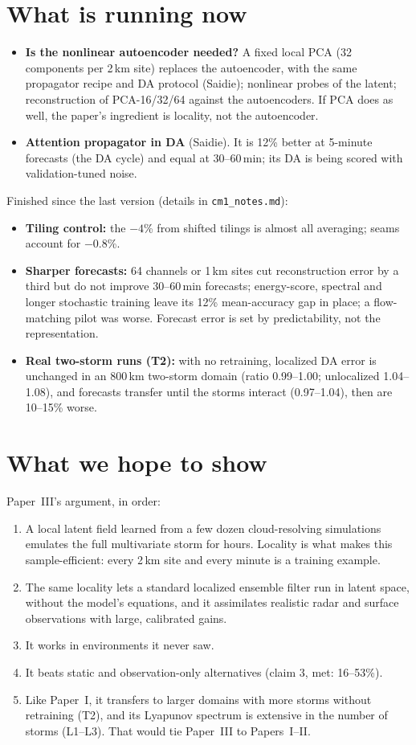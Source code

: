 \documentclass[11pt]{article}
\begin{document}
\section{What is running now}
\begin{itemize}
\item \textbf{Is the nonlinear autoencoder needed?} A fixed local PCA (32 components per 2\,km site) replaces the autoencoder, with the same propagator recipe and DA protocol (Saidie); nonlinear probes of the latent; reconstruction of PCA-16/32/64 against the autoencoders. If PCA does as well, the paper's ingredient is locality, not the autoencoder.
\item \textbf{Attention propagator in DA} (Saidie). It is 12\% better at 5-minute forecasts (the DA cycle) and equal at 30--60\,min; its DA is being scored with validation-tuned noise.
\end{itemize}
Finished since the last version (details in \texttt{cm1\_notes.md}):
\begin{itemize}
\item \textbf{Tiling control:} the $-4$\% from shifted tilings is almost all averaging; seams account for $-0.8$\%.
\item \textbf{Sharper forecasts:} 64 channels or 1\,km sites cut reconstruction error by a third but do not improve 30--60\,min forecasts; energy-score, spectral and longer stochastic training leave its 12\% mean-accuracy gap in place; a flow-matching pilot was worse. Forecast error is set by predictability, not the representation.
\item \textbf{Real two-storm runs (T2):} with no retraining, localized DA error is unchanged in an 800\,km two-storm domain (ratio 0.99--1.00; unlocalized 1.04--1.08), and forecasts transfer until the storms interact (0.97--1.04), then are 10--15\% worse.
\end{itemize}

\section{What we hope to show}
Paper~III's argument, in order:
\begin{enumerate}
\item A local latent field learned from a few dozen cloud-resolving simulations emulates the full multivariate storm for hours. Locality is what makes this sample-efficient: every 2\,km site and every minute is a training example.
\item The same locality lets a standard localized ensemble filter run in latent space, without the model's equations, and it assimilates realistic radar and surface observations with large, calibrated gains.
\item It works in environments it never saw.
\item It beats static and observation-only alternatives (claim 3, met: 16--53\%).
\item Like Paper~I, it transfers to larger domains with more storms without retraining (T2), and its Lyapunov spectrum is extensive in the number of storms (L1--L3). That would tie Paper~III to Papers~I--II.
\end{enumerate}
\end{document}
